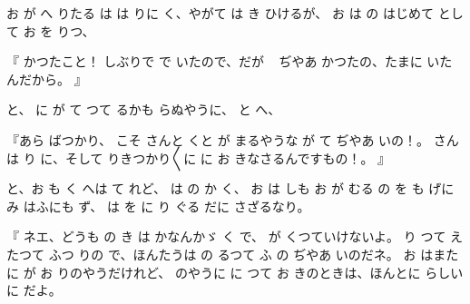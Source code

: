 お
が
へ
りたる
は
は
りに
く、やがて
は
き
ひけるが、
お
は
の
はじめて
として
お
を
りつ、

『
かつたこと！
しぶりで
で
いたので、だが
\ %
ぢやあ
かつたの、たまに
いたんだから。
』

と、
に
が
て
つて
るかも
らぬやうに、
と
へ、

『あら
ばつかり、
こそ
さんと
くと
が
まるやうな
が
て
ぢやあ
いの！。
さんは
り
に、そして
りきつかり〳〵に
に
お
きなさるんですもの！。
』

と、お
も
く
へは
て
れど、
は
の
か
く、
お
は
しも
お
が
むる
の
を
も
げに
み
はふにも
ず、
は
を
に
り
ぐる
だに
さざるなり。

『
ネエ、どうも
の
き
は
かなんかゞ
く
で、
が
くつていけないよ。
り
つて
えたつて
ふつ
りの
で、ほんたうは
の
るつて
ふ
の
ぢやあ
いのだネ。
お
はまた
に
が
お
りのやうだけれど、
のやうに
に
つて
お
きのときは、ほんとに
らしい
に
だよ。

